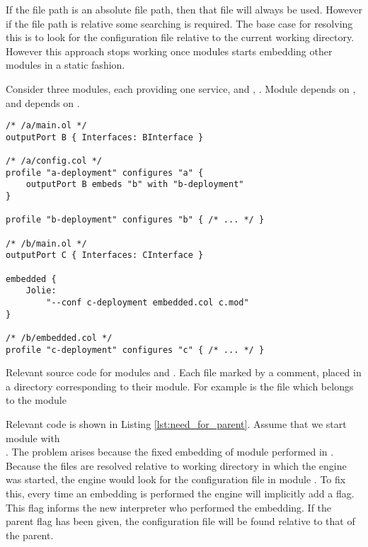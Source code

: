 If the file path is an absolute file path, then that file will always be used.
However if the file path is relative some searching is required. The base case
for resolving this is to look for the configuration file relative to the
current working directory. However this approach stops working once modules starts
embedding other modules in a static fashion.

Consider three modules, each providing one service,  and ,
. Module  depends on , and  depends on
.

\begin{listing}[H]
\begin{verbatim}
/* /a/main.ol */
outputPort B { Interfaces: BInterface }

/* /a/config.col */
profile "a-deployment" configures "a" {
    outputPort B embeds "b" with "b-deployment"
}

profile "b-deployment" configures "b" { /* ... */ }

/* /b/main.ol */
outputPort C { Interfaces: CInterface }

embedded {
    Jolie:
        "--conf c-deployment embedded.col c.mod"
}

/* /b/embedded.col */
profile "c-deployment" configures "c" { /* ... */ }
\end{verbatim}

\caption{Relevant source code for modules  and . Each file
    marked by a comment, placed in a directory corresponding to their module.
        For example  is the  file which belongs
        to the module }

\label{lst:need_for_parent}

\end{listing}

Relevant code is shown in Listing \ref{lst:need_for_parent}.  Assume that we
start module  with \\.  The
problem arises because the fixed embedding of module  performed in
. Because the files are resolved relative to working directory in which
the engine was started, the engine would look for the configuration file in
module . To fix this, every time an embedding is performed the engine
will implicitly add a  flag. This flag informs the new
interpreter who performed the embedding. If the parent flag has
been given, the configuration file will be found relative to that of the
parent.

